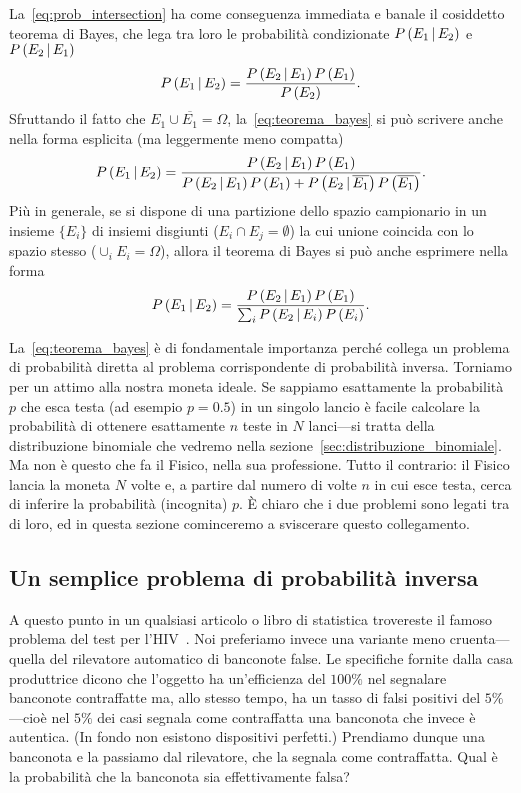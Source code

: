 La~\eqref{eq:prob_intersection} ha come conseguenza immediata e banale il
cosiddetto teorema di Bayes, che lega tra loro le probabilità condizionate
$\displaystyle P\left(E_1 \,|\, E_2\right)$ e $\displaystyle P\left(E_2 \,|\, E_1\right)$
\begin{align}\label{eq:teorema_bayes}
  \displaystyle P\left(E_1 \,|\, E_2\right) = \frac{\displaystyle P\left(E_2 \,|\, E_1\right)\displaystyle P\left(E_1\right)}{\displaystyle P\left(E_2\right)}.
\end{align}
Sfruttando il fatto che $E_1 \cup \overline{E_1} = \Omega$,
la~\eqref{eq:teorema_bayes} si può scrivere anche nella forma esplicita
(ma leggermente meno compatta)
\begin{align}
  \displaystyle P\left(E_1 \,|\, E_2\right) =
  \frac{\displaystyle P\left(E_2 \,|\, E_1\right)\displaystyle P\left(E_1\right)}{\displaystyle P\left(E_2 \,|\, E_1\right)\displaystyle P\left(E_1\right) +
  \displaystyle P\left(E_2 \,|\, \overline{E_1}\right)\displaystyle P\left(\overline{E_1}\right)}.
\end{align}
Più in generale, se si dispone di una partizione dello spazio campionario
in un insieme $\{E_i\}$ di insiemi disgiunti ($E_i \cap E_j = \emptyset$) la cui
unione coincida con lo spazio stesso ($\cup_i E_i = \Omega$), allora il teorema
di Bayes si può anche esprimere nella forma
\begin{align}
  \displaystyle P\left(E_1 \,|\, E_2\right) =
  \frac{\displaystyle P\left(E_2 \,|\, E_1\right)\displaystyle P\left(E_1\right)}{\sum_i \displaystyle P\left(E_2 \,|\, E_i\right)\displaystyle P\left(E_i\right)}.
\end{align}

La~\eqref{eq:teorema_bayes} è di fondamentale importanza perché collega un
problema di probabilità diretta al problema corrispondente di probabilità
inversa. Torniamo per un attimo alla nostra moneta ideale. Se sappiamo
esattamente la probabilità $p$ che esca testa (ad esempio $p = 0.5$) in un
singolo lancio è facile calcolare la probabilità di ottenere esattamente
$n$ teste in $N$ lanci---si tratta della distribuzione binomiale che vedremo
nella sezione~\ref{sec:distribuzione_binomiale}. Ma non è questo che fa il
Fisico, nella sua professione. Tutto il contrario: il Fisico lancia la
moneta $N$ volte e, a partire dal numero di volte $n$ in cui esce testa,
cerca di inferire la probabilità (incognita) $p$. \`E chiaro che i due
problemi sono legati tra di loro, ed in questa sezione cominceremo a sviscerare
questo collegamento.


\subsection{Un semplice problema di probabilità inversa}
\label{sec:rilevatore_banconote}

A questo punto in un qualsiasi articolo o libro di statistica trovereste
il famoso problema del test per l'HIV~\cite{dagostini_review}. Noi preferiamo
invece una variante meno cruenta---quella del rilevatore automatico di
banconote false. Le specifiche fornite dalla casa produttrice dicono che
l'oggetto ha un'efficienza del $100\%$ nel segnalare banconote contraffatte
ma, allo stesso tempo, ha un tasso di falsi positivi del $5\%$---cioè nel
$5\%$ dei casi segnala come contraffatta una banconota che invece è
autentica. (In fondo non esistono dispositivi perfetti.) Prendiamo dunque una
banconota e la passiamo dal rilevatore, che la segnala come contraffatta.
Qual è la probabilità che la banconota sia effettivamente falsa?

